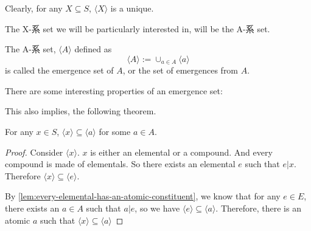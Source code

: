 Clearly, for any $X\subseteq S$, $\langle X \rangle$ is a unique.

The X-系 set we will be particularly interested in, will be the A-系 set. 

\begin{axiom}\label{ax:the emergence-set-of-A}
    The A-系 set, $\langle A \rangle$ defined as
     $$\langle A \rangle := \cup_{a\in A} \langle a \rangle$$ 
     is called the emergence set of $A$, or the set of emergences from $A$. 
\end{axiom}


There are some interesting properties of an emergence set: 










This also implies, the following theorem. 
\begin{theorem}\label{thm:every-hai-set-is-a-subset-of-a-hai-set-whose-head-is-atomic}
    For any $x\in S$, $\langle x \rangle \subseteq \langle a \rangle$ for some $a\in A$.
\end{theorem}
\begin{proof}
    Consider $\langle x \rangle$. $x$ is either an elemental or a compound. And every compound is made of elementals. So there exists an elemental $e$ such that $e|x$. Therefore $\langle x \rangle \subseteq \langle e \rangle$. 
    
    By \ref{lem:every-elemental-has-an-atomic-constituent}, we know that for any $e \in E$, there exists an $a \in A$ such that $a|e$, so we have $\langle e \rangle \subseteq \langle a \rangle$. Therefore, there is an atomic $a$ such that $\langle x \rangle \subseteq \langle a \rangle$
    
\end{proof}


